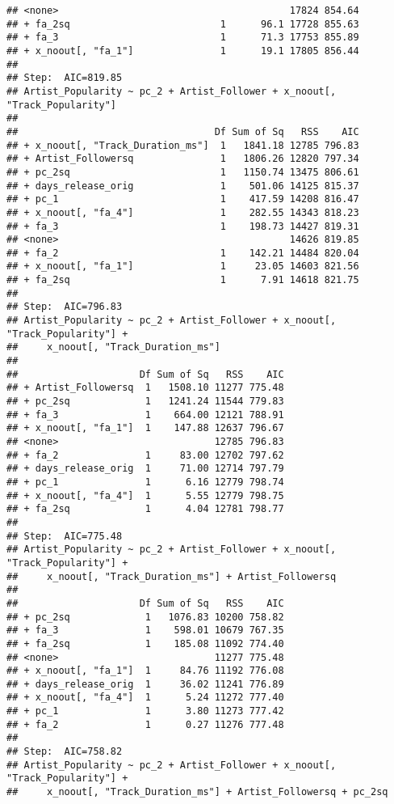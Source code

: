 \documentclass[
]{article}
\begin{document}
\begin{verbatim}
## <none>                                        17824 854.64
## + fa_2sq                          1      96.1 17728 855.63
## + fa_3                            1      71.3 17753 855.89
## + x_noout[, "fa_1"]               1      19.1 17805 856.44
## 
## Step:  AIC=819.85
## Artist_Popularity ~ pc_2 + Artist_Follower + x_noout[, "Track_Popularity"]
## 
##                                  Df Sum of Sq   RSS    AIC
## + x_noout[, "Track_Duration_ms"]  1   1841.18 12785 796.83
## + Artist_Followersq               1   1806.26 12820 797.34
## + pc_2sq                          1   1150.74 13475 806.61
## + days_release_orig               1    501.06 14125 815.37
## + pc_1                            1    417.59 14208 816.47
## + x_noout[, "fa_4"]               1    282.55 14343 818.23
## + fa_3                            1    198.73 14427 819.31
## <none>                                        14626 819.85
## + fa_2                            1    142.21 14484 820.04
## + x_noout[, "fa_1"]               1     23.05 14603 821.56
## + fa_2sq                          1      7.91 14618 821.75
## 
## Step:  AIC=796.83
## Artist_Popularity ~ pc_2 + Artist_Follower + x_noout[, "Track_Popularity"] + 
##     x_noout[, "Track_Duration_ms"]
## 
##                     Df Sum of Sq   RSS    AIC
## + Artist_Followersq  1   1508.10 11277 775.48
## + pc_2sq             1   1241.24 11544 779.83
## + fa_3               1    664.00 12121 788.91
## + x_noout[, "fa_1"]  1    147.88 12637 796.67
## <none>                           12785 796.83
## + fa_2               1     83.00 12702 797.62
## + days_release_orig  1     71.00 12714 797.79
## + pc_1               1      6.16 12779 798.74
## + x_noout[, "fa_4"]  1      5.55 12779 798.75
## + fa_2sq             1      4.04 12781 798.77
## 
## Step:  AIC=775.48
## Artist_Popularity ~ pc_2 + Artist_Follower + x_noout[, "Track_Popularity"] + 
##     x_noout[, "Track_Duration_ms"] + Artist_Followersq
## 
##                     Df Sum of Sq   RSS    AIC
## + pc_2sq             1   1076.83 10200 758.82
## + fa_3               1    598.01 10679 767.35
## + fa_2sq             1    185.08 11092 774.40
## <none>                           11277 775.48
## + x_noout[, "fa_1"]  1     84.76 11192 776.08
## + days_release_orig  1     36.02 11241 776.89
## + x_noout[, "fa_4"]  1      5.24 11272 777.40
## + pc_1               1      3.80 11273 777.42
## + fa_2               1      0.27 11276 777.48
## 
## Step:  AIC=758.82
## Artist_Popularity ~ pc_2 + Artist_Follower + x_noout[, "Track_Popularity"] + 
##     x_noout[, "Track_Duration_ms"] + Artist_Followersq + pc_2sq

\end{verbatim}
\end{document}
